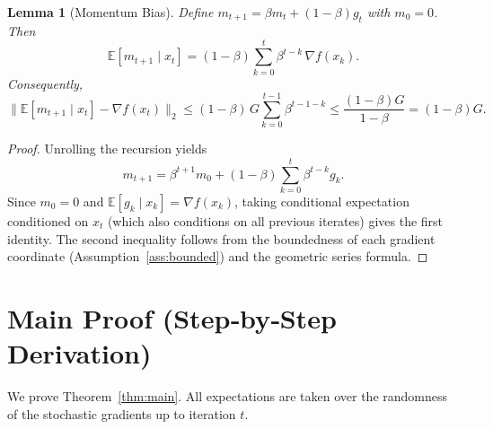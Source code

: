 \documentclass[11pt]{article}
\newtheorem{lemma}{Lemma}
\newcommand{\E}{\mathbb{E}}
\begin{document}
\begin{lemma}[Momentum Bias]\label{lem:momentum-bias}
Define $m_{t+1}= \beta m_t+(1-\beta)g_t$ with $m_0=0$.
Then
\[
\E[m_{t+1}\mid x_t]= (1-\beta)\sum_{k=0}^{t}\beta^{t-k}\,\nabla f(x_k).
\]
Consequently,
\[
\big\|\E[m_{t+1}\mid x_t]-\nabla f(x_t)\big\|_{2}
\le (1-\beta)\,G\sum_{k=0}^{t-1}\beta^{t-1-k}
\le\frac{(1-\beta)G}{1-\beta}= (1-\beta)G .
\]
\end{lemma}
\begin{proof}
Unrolling the recursion yields
\[
m_{t+1}= \beta^{t+1}m_0 + (1-\beta)\sum_{k=0}^{t}\beta^{t-k} g_k.
\]
Since $m_0=0$ and $\E[g_k\mid x_k]=\nabla f(x_k)$, taking conditional expectation
conditioned on $x_t$ (which also conditions on all previous iterates) gives the first identity.
The second inequality follows from the boundedness of each gradient coordinate
(Assumption~\ref{ass:bounded}) and the geometric series formula. \qedhere
\end{proof}

\newpage
\section*{Main Proof (Step‑by‑Step Derivation)}
We prove Theorem~\ref{thm:main}.  All expectations are taken over the randomness of the stochastic gradients up to iteration $t$.
\end{document}
